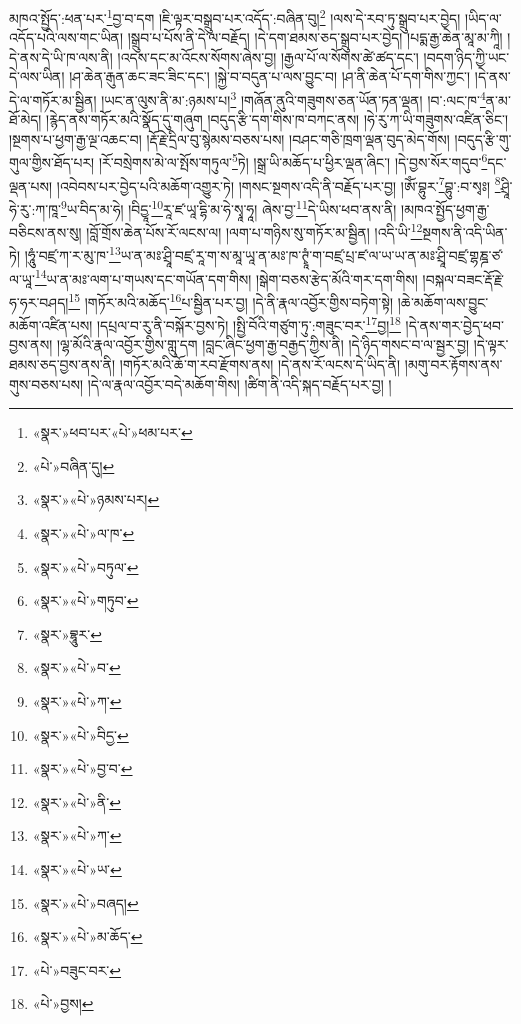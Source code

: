 མཁའ་སྤྱོད་:ཕན་པར་\footnote{«སྣར་»ཕབ་པར་«པེ་»ཕམ་པར་}བྱ་བ་དག །ཇི་ལྟར་བསྒྲུབ་པར་འདོད་:བཞིན་བུ།\footnote{«པེ་»བཞིན་དུ།} །ལས་དེ་རབ་ཏུ་སྒྲུབ་པར་བྱེད། །ཡིད་ལ་འདོད་པའི་ལས་གང་ཡིན། །སྒྲུབ་པ་པོས་ནི་དེ་ལ་བརྗོད། །དེ་དག་ཐམས་ཅད་སྒྲུབ་པར་བྱེད། །པདྨ་རྒྱ་ཆེན་མཱ་མ་ཀཱི། །དེ་ནས་དེ་ཡི་ཁ་ལས་ནི། །འདས་དང་མ་འོངས་སོགས་ཞེས་བྱ། །རྒྱལ་པོ་ལ་སོགས་ཚེ་ཚད་དང་། །བདག་ཉིད་ཀྱི་ཡང་དེ་ལས་ཡིན། །ཤ་ཆེན་རྒུན་ཆང་ཟང་ཟིང་དང་། །སྐྱེ་བ་བདུན་པ་ལས་བྱུང་བ། །ཤ་ནི་ཆེན་པོ་དག་གིས་ཀྱང་། །དེ་ནས་དེ་ལ་གཏོར་མ་སྦྱིན། །ཡང་ན་ལུས་ནི་མ་:ཉམས་པ།\footnote{«སྣར་»«པེ་»ཉམས་པར།} །གཞོན་ནུའི་གཟུགས་ཅན་ཡོན་ཏན་ལྡན། །བ་:ལང་ཁ་\footnote{«སྣར་»«པེ་»ལ་ཁ་}ན་མ་ཐོ་མེད། །རྙེད་ནས་གཏོར་མའི་སྣོད་དུ་གཞུག །བདུད་རྩི་དག་གིས་ཁ་བཀང་ནས། །ཧེ་རུ་ཀ་ཡི་གཟུགས་འཛིན་ཅིང་། །སྔགས་པ་ཕྱག་རྒྱ་ལྔ་འཆང་བ། །རྡོ་རྗེ་དྲིལ་བུ་སྙེམས་བཅས་པས། །བཤང་གཅི་ཁྲག་ལྡན་བུད་མེད་གོས། །བདུད་རྩི་གུ་གུལ་གྱིས་ཐོད་པར། །རོ་བསྲེགས་མེ་ལ་སྤོས་གཏུལ་\footnote{«སྣར་»«པེ་»བཏུལ་}ཏེ། །སྒྲ་ཡི་མཆོད་པ་ཕྱིར་ལྡན་ཞིང་། །དེ་བྱས་སོར་གདུབ་\footnote{«སྣར་»«པེ་»གཏུབ་}དང་ལྡན་པས། །འབེབས་པར་བྱེད་པའི་མཆོག་འགྱུར་ཏེ། །གསང་སྔགས་འདི་ནི་བརྗོད་པར་བྱ། །ཨོཾ་བྷུར་\footnote{«སྣར་»བྷཱུར་}བྷུ་:བ་སྭཿ། \footnote{«སྣར་»«པེ་»བ་}ཤྲཱི་ཧེ་རུ་:ཀ་ཁཱ་\footnote{«སྣར་»«པེ་»ཀ་}ཡ་བིད་མ་ཧེ། །བིདྱཱ་\footnote{«སྣར་»«པེ་»བིདྱ་}རཱ་ཛ་ཡཱ་དྷི་མ་ཧེ་སྭཱ་ཧཱ། ཞེས་བྱ་\footnote{«སྣར་»«པེ་»བྱ་བ་}དེ་ཡིས་ཕབ་ནས་ནི། །མཁའ་སྤྱོད་ཕྱག་རྒྱ་བཅིངས་ནས་སུ། །བློ་གྲོས་ཆེན་པོས་རོ་ལངས་ལ། །ལག་པ་གཉིས་སུ་གཏོར་མ་སྦྱིན། །འདི་ཡི་\footnote{«སྣར་»«པེ་»ནི་}སྔགས་ནི་འདི་ཡིན་ཏེ། །ཧཱུཾ་བཛྲ་ཀ་ར་མུ་ཁ་\footnote{«སྣར་»«པེ་»ཀ་}ཡ་ན་མཿ་ཤྲཱི་བཛྲ་རཱ་ག་ས་མཱ་ཡཱ་ན་མཿ་ཁ་ཊྭཱཾ་ག་བཛྲ་པྲ་ཛ་ལ་ཡ་ཡ་ན་མཿ་ཤྲཱི་བཛྲ་གྷཎྜ་ཙ་ལ་ཡཱ་\footnote{«སྣར་»«པེ་»ཡ་}ཡ་ན་མཿ་ལག་པ་གཡས་དང་གཡོན་དག་གིས། །སྒེག་བཅས་རྩེད་མོའི་གར་དག་གིས། །བསྐལ་བཟང་རྡོ་རྗེ་ཧ་ཧར་བཤད།\footnote{«སྣར་»«པེ་»བཞད།} །གཏོར་མའི་མཆོད་\footnote{«སྣར་»«པེ་»མ་ཆོད་}པ་སྦྱིན་པར་བྱ། །དེ་ནི་རྣལ་འབྱོར་གྱིས་བཏེག་སྟེ། །ཆེ་མཆོག་ལས་བྱུང་མཆོག་འཛིན་པས། །དཔྲལ་བ་རུ་ནི་བསྐོར་བྱས་ཏེ། །སྤྱི་བོའི་གཙུག་ཏུ་:གཟུང་བར་\footnote{«པེ་»བཟུང་བར་}བྱ།\footnote{«པེ་»བྱས།} །དེ་ནས་གར་བྱེད་ཕབ་བྱས་ནས། །ལྷ་མོའི་རྣལ་འབྱོར་གྱིས་གླུ་དག །བླང་ཞིང་ཕྱག་རྒྱ་བརྒྱད་ཀྱིས་ནི། །དེ་ཉིད་གསང་བ་ལ་སྦྱར་བྱ། །དེ་ལྟར་ཐམས་ཅད་བྱས་ནས་ནི། །གཏོར་མའི་ཆོ་ག་རབ་རྫོགས་ནས། །དེ་ནས་རོ་ལངས་དེ་ཡིད་ནི། །མགུ་བར་རྟོགས་ནས་གུས་བཅས་པས། །དེ་ལ་རྣལ་འབྱོར་བདེ་མཆོག་གིས། །ཚིག་ནི་འདི་སྐད་བརྗོད་པར་བྱ། །
